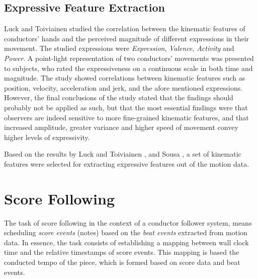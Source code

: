 \section{Expressive Feature Extraction}

Luck and Toiviainen \cite{luck2010}
studied the correlation between the kinematic features of conductors' hands
and the perceived magnitude of different expressions in their movement.
The studied expressions were
\textit{Expression}, \textit{Valence}, \textit{Activity} and \textit{Power}.
A point-light representation of two conductors' movements
was presented to subjects, who rated the expressiveness
on a continuous scale in both time and magnitude.
The study showed correlations between kinematic features
such as position, velocity, acceleration and jerk,
and the afore mentioned expressions.
However, the final conclusions of the study stated that
the findings should probably not be applied as such,
but that the most essential findings were that observers
are indeed sensitive to more fine-grained kinematic features,
and that increased amplitude, greater variance and higher speed of movement
convey higher levels of expressivity.

Based on the results by Luck and Toiviainen \cite{luck2010},
and Sousa \cite{sousa1988},
a set of kinematic features were selected for extracting
expressive features out of the motion data.

\chapter{Score Following}
\label{chapter:score_following}

The task of score following in the context
of a conductor follower system,
means scheduling \textit{score events} (notes)
based on the \textit{beat events} extracted
from motion data.
In essence, the task consists of establishing a mapping between
wall clock time and the relative timestamps of score events.
This mapping is based the conducted tempo of the piece,
which is formed based on score data and beat events.

